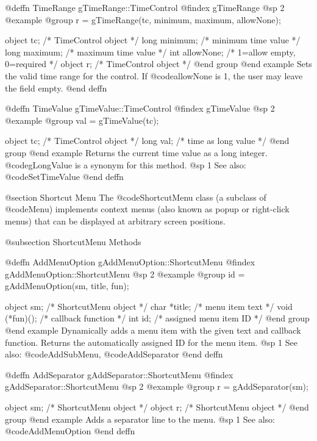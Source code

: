 @deffn {TimeRange} gTimeRange::TimeControl
@findex gTimeRange
@sp 2
@example
@group
r = gTimeRange(tc, minimum, maximum, allowNone);

object  tc;          /*  TimeControl object          */
long    minimum;     /*  minimum time value           */
long    maximum;     /*  maximum time value           */
int     allowNone;   /*  1=allow empty, 0=required    */
object  r;           /*  TimeControl object           */
@end group
@end example
Sets the valid time range for the control.  If @code{allowNone} is 1,
the user may leave the field empty.
@end deffn



@deffn {TimeValue} gTimeValue::TimeControl
@findex gTimeValue
@sp 2
@example
@group
val = gTimeValue(tc);

object  tc;    /*  TimeControl object  */
long    val;   /*  time as long value  */
@end group
@end example
Returns the current time value as a long integer.
@code{gLongValue} is a synonym for this method.
@sp 1
See also:  @code{SetTimeValue}
@end deffn




@section Shortcut Menu
The @code{ShortcutMenu} class (a subclass of @code{Menu}) implements
context menus (also known as popup or right-click menus) that can be
displayed at arbitrary screen positions.

@subsection ShortcutMenu Methods



@deffn {AddMenuOption} gAddMenuOption::ShortcutMenu
@findex gAddMenuOption::ShortcutMenu
@sp 2
@example
@group
id = gAddMenuOption(sm, title, fun);

object  sm;      /*  ShortcutMenu object        */
char    *title;  /*  menu item text              */
void    (*fun)();  /*  callback function         */
int     id;      /*  assigned menu item ID       */
@end group
@end example
Dynamically adds a menu item with the given text and callback function.
Returns the automatically assigned ID for the menu item.
@sp 1
See also:  @code{AddSubMenu}, @code{AddSeparator}
@end deffn



@deffn {AddSeparator} gAddSeparator::ShortcutMenu
@findex gAddSeparator::ShortcutMenu
@sp 2
@example
@group
r = gAddSeparator(sm);

object  sm;   /*  ShortcutMenu object  */
object  r;    /*  ShortcutMenu object  */
@end group
@end example
Adds a separator line to the menu.
@sp 1
See also:  @code{AddMenuOption}
@end deffn



